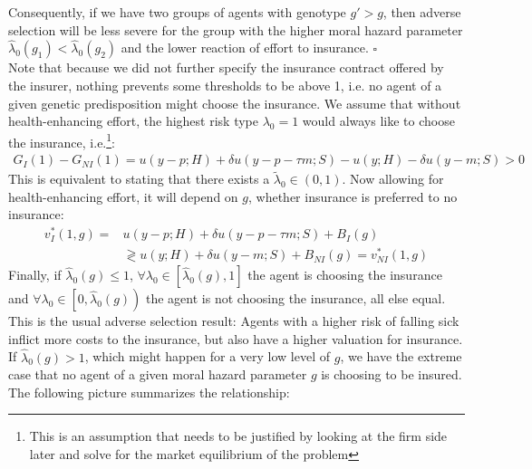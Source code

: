 Consequently, if we have two groups of agents with genotype $g'>g$, then adverse selection will be less severe for the group with the higher moral hazard parameter $\hat{\lambda}_0(g_1)<\hat{\lambda}_0(g_2)$ and the lower reaction of effort to insurance. $\square$\\


Note that because we did not further specify the insurance contract offered by the insurer, nothing prevents some thresholds to be above 1, i.e. no agent of a given genetic predisposition might choose the insurance.
We assume that without health-enhancing effort, the highest risk type $\lambda_0=1$ would always like to choose the insurance, i.e.\footnote{This is an assumption that needs to be justified by looking at the firm side later and solve for the market equilibrium of the problem}:
\begin{align*}
G_I(1)-G_{NI}(1)=u(y-p;H)+\delta u(y-p-\tau m;S)-u(y;H)-\delta u(y-m;S)>0
\end{align*}
This is equivalent to stating that there exists a $\tilde{\lambda}_0\in(0,1)$.
Now allowing for health-enhancing effort, it will depend on $g$, whether insurance is preferred to no insurance:
\begin{align*}
v_I^*(1,g)=&u(y-p;H)+\delta u(y-p-\tau m;S)+B_I(g)\\
&\gtrless u(y;H)+\delta u(y-m;S)+B_{NI}(g)=v_{NI}^*(1,g)
\end{align*}
Finally, if $\hat{\lambda}_0(g)\leq1$, $\forall \lambda_0 \in \left[ \hat{\lambda}_0(g),1\right] $ the agent is choosing the insurance and $\forall \lambda_0\in\left[ 0,\hat{\lambda}_0(g)\right) $ the agent is not choosing the insurance, all else equal. This is the usual adverse selection result: Agents with a higher risk of falling sick inflict more costs to the insurance, but also have a higher valuation for insurance. If $\hat{\lambda}_0(g)>1$, which might happen for a very low level of $g$, we have the extreme case that no agent of a given moral hazard parameter $g$ is choosing to be insured.\\

The following picture summarizes the relationship:

